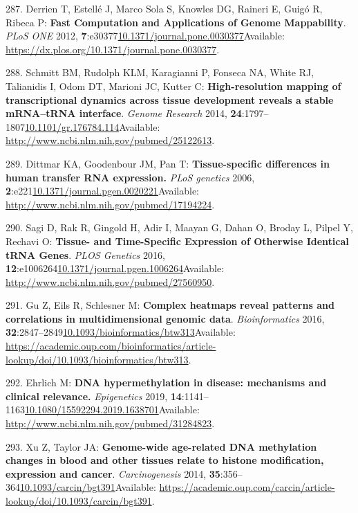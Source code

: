 \documentclass[
]{book}
\begin{document}
\leavevmode\hypertarget{ref-Derrien2012}{}%
287. Derrien T, Estellé J, Marco Sola S, Knowles DG, Raineri E, Guigó R, Ribeca P: \textbf{Fast Computation and Applications of Genome Mappability}. \emph{PLoS ONE} 2012, \textbf{7}:e30377\href{https://doi.org/10.1371/journal.pone.0030377}{10.1371/journal.pone.0030377}Available: \url{https://dx.plos.org/10.1371/journal.pone.0030377}.

\leavevmode\hypertarget{ref-Schmitt2014b}{}%
288. Schmitt BM, Rudolph KLM, Karagianni P, Fonseca NA, White RJ, Talianidis I, Odom DT, Marioni JC, Kutter C: \textbf{High-resolution mapping of transcriptional dynamics across tissue development reveals a stable mRNA--tRNA interface}. \emph{Genome Research} 2014, \textbf{24}:1797--1807\href{https://doi.org/10.1101/gr.176784.114}{10.1101/gr.176784.114}Available: \url{http://www.ncbi.nlm.nih.gov/pubmed/25122613}.

\leavevmode\hypertarget{ref-Dittmar2006}{}%
289. Dittmar KA, Goodenbour JM, Pan T: \textbf{Tissue-specific differences in human transfer RNA expression.} \emph{PLoS genetics} 2006, \textbf{2}:e221\href{https://doi.org/10.1371/journal.pgen.0020221}{10.1371/journal.pgen.0020221}Available: \url{http://www.ncbi.nlm.nih.gov/pubmed/17194224}.

\leavevmode\hypertarget{ref-Sagi2016}{}%
290. Sagi D, Rak R, Gingold H, Adir I, Maayan G, Dahan O, Broday L, Pilpel Y, Rechavi O: \textbf{Tissue- and Time-Specific Expression of Otherwise Identical tRNA Genes}. \emph{PLOS Genetics} 2016, \textbf{12}:e1006264\href{https://doi.org/10.1371/journal.pgen.1006264}{10.1371/journal.pgen.1006264}Available: \url{http://www.ncbi.nlm.nih.gov/pubmed/27560950}.

\leavevmode\hypertarget{ref-Gu2016}{}%
291. Gu Z, Eils R, Schlesner M: \textbf{Complex heatmaps reveal patterns and correlations in multidimensional genomic data}. \emph{Bioinformatics} 2016, \textbf{32}:2847--2849\href{https://doi.org/10.1093/bioinformatics/btw313}{10.1093/bioinformatics/btw313}Available: \url{https://academic.oup.com/bioinformatics/article-lookup/doi/10.1093/bioinformatics/btw313}.

\leavevmode\hypertarget{ref-Ehrlich2019}{}%
292. Ehrlich M: \textbf{DNA hypermethylation in disease: mechanisms and clinical relevance.} \emph{Epigenetics} 2019, \textbf{14}:1141--1163\href{https://doi.org/10.1080/15592294.2019.1638701}{10.1080/15592294.2019.1638701}Available: \url{http://www.ncbi.nlm.nih.gov/pubmed/31284823}.

\leavevmode\hypertarget{ref-Xu2014b}{}%
293. Xu Z, Taylor JA: \textbf{Genome-wide age-related DNA methylation changes in blood and other tissues relate to histone modification, expression and cancer}. \emph{Carcinogenesis} 2014, \textbf{35}:356--364\href{https://doi.org/10.1093/carcin/bgt391}{10.1093/carcin/bgt391}Available: \url{https://academic.oup.com/carcin/article-lookup/doi/10.1093/carcin/bgt391}.
\end{document}

